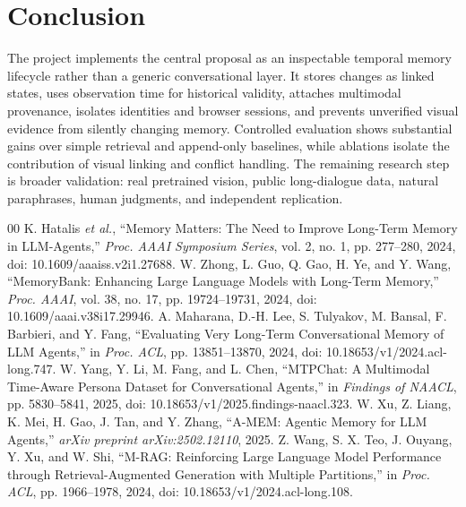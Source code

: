 \documentclass[conference]{IEEEtran}
\begin{document}
\section{Conclusion}
The project implements the central proposal as an inspectable temporal memory lifecycle rather than a generic conversational layer. It stores changes as linked states, uses observation time for historical validity, attaches multimodal provenance, isolates identities and browser sessions, and prevents unverified visual evidence from silently changing memory. Controlled evaluation shows substantial gains over simple retrieval and append-only baselines, while ablations isolate the contribution of visual linking and conflict handling. The remaining research step is broader validation: real pretrained vision, public long-dialogue data, natural paraphrases, human judgments, and independent replication.

\begin{thebibliography}{00}
 K. Hatalis \emph{et al.}, ``Memory Matters: The Need to Improve Long-Term Memory in LLM-Agents,'' \emph{Proc. AAAI Symposium Series}, vol. 2, no. 1, pp. 277--280, 2024, doi: 10.1609/aaaiss.v2i1.27688.
 W. Zhong, L. Guo, Q. Gao, H. Ye, and Y. Wang, ``MemoryBank: Enhancing Large Language Models with Long-Term Memory,'' \emph{Proc. AAAI}, vol. 38, no. 17, pp. 19724--19731, 2024, doi: 10.1609/aaai.v38i17.29946.
 A. Maharana, D.-H. Lee, S. Tulyakov, M. Bansal, F. Barbieri, and Y. Fang, ``Evaluating Very Long-Term Conversational Memory of LLM Agents,'' in \emph{Proc. ACL}, pp. 13851--13870, 2024, doi: 10.18653/v1/2024.acl-long.747.
 W. Yang, Y. Li, M. Fang, and L. Chen, ``MTPChat: A Multimodal Time-Aware Persona Dataset for Conversational Agents,'' in \emph{Findings of NAACL}, pp. 5830--5841, 2025, doi: 10.18653/v1/2025.findings-naacl.323.
 W. Xu, Z. Liang, K. Mei, H. Gao, J. Tan, and Y. Zhang, ``A-MEM: Agentic Memory for LLM Agents,'' \emph{arXiv preprint arXiv:2502.12110}, 2025.
 Z. Wang, S. X. Teo, J. Ouyang, Y. Xu, and W. Shi, ``M-RAG: Reinforcing Large Language Model Performance through Retrieval-Augmented Generation with Multiple Partitions,'' in \emph{Proc. ACL}, pp. 1966--1978, 2024, doi: 10.18653/v1/2024.acl-long.108.
\end{thebibliography}
\end{document}
